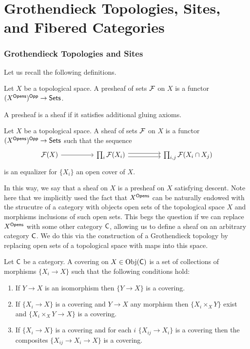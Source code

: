\part*{Grothendieck Topologies, Sites, and Fibered Categories}\label{part: topologies sites and fibered categories}
\section{Grothendieck Topologies and Sites}\label{sec: grothendieck topologies}
Let us recall the following definitions. 
\begin{definition}[Presheaf]\label{def: presheaf on topological space}
    Let $X$ be a topological space. A presheaf of sets $\mathcal{F}$ on $X$ is a functor $(X^{\mathsf{Opens}})^{\mathsf{Opp}}\to\mathsf{Sets}$. 
\end{definition}
A presheaf is a sheaf if it satisfies additional gluing axioms. 
\begin{definition}[Sheaf]\label{def: topological sheaf}
    Let $X$ be a topological space. A sheaf of sets $\mathcal{F}$ on $X$ is a functor $(X^{\mathsf{Opens}})^{\mathsf{Opp}}\to\mathsf{Sets}$ such that the sequence 
    $$%
    \begin{tikzcd}
        {\Fcal(X)} && {\prod_{i}\Fcal(X_{i})} && {\prod_{i,j}\Fcal(X_{i}\cap X_{j})}
        \arrow[from=1-1, to=1-3]
        \arrow[shift left, from=1-3, to=1-5]
        \arrow[shift right, from=1-3, to=1-5]
    \end{tikzcd}$$
    is an equalizer for $\{X_{i}\}$ an open cover of $X$.  
\end{definition}
In this way, we say that a sheaf on $X$ is a presheaf on $X$ satisfying descent. Note here that we implicitly used the fact that $X^{\mathsf{Opens}}$ can be naturally endowed with the strucutre of a category with objects open sets of the topological space $X$ and morphisms inclusions of such open sets. This begs the question if we can replace $X^{\mathsf{Opens}}$ with some other category $\mathsf{C}$, allowing us to define a sheaf on an arbitrary category $\mathsf{C}$. We do this via the construction of a Grothendieck topology by replacing open sets of a topological space with maps into this space. 
\begin{definition}[Covering]\label{def: cover}
    Let $\mathsf{C}$ be a category. A covering on $X\in\mathrm{Obj}(\mathsf{C})$ is a set of collections of morphisms $\{X_{i}\to X\}$ such that the following conditions hold:
    \begin{enumerate}[label=(\alph*)]
        \item If $Y\to X$ is an isomorphism then $\{Y\to X\}$ is a covering.  
        \item If $\{X_{i}\to X\}$ is a covering and $Y\to X$ any morphism then $\{X_{i}\times_{X}Y\}$ exist and $\{X_{i}\times_{X}Y\to X\}$ is a covering. 
        \item If $\{X_{i}\to X\}$ is a covering and for each $i$ $\{X_{ij}\to X_{i}\}$ is a covering then the composites $\{X_{ij}\to X_{i}\to X\}$ is a covering. 
    \end{enumerate}
\end{definition}
